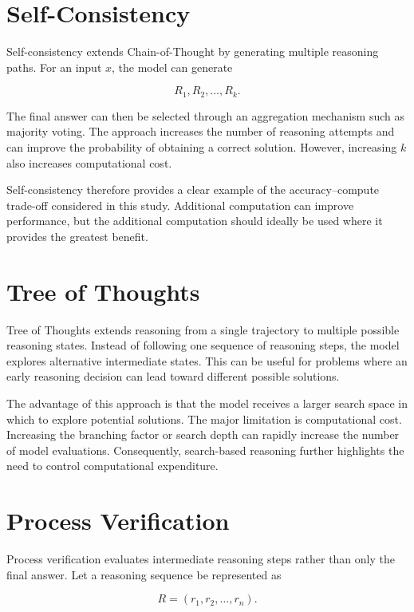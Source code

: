\documentclass[12pt,a4paper,titlepage]{report}
\begin{document}
\section{Self-Consistency}

Self-consistency extends Chain-of-Thought by generating multiple reasoning paths. For an input $x$, the model can generate

\begin{equation}
R_1,R_2,\ldots,R_k.
\end{equation}

The final answer can then be selected through an aggregation mechanism such as majority voting. The approach increases the number of reasoning attempts and can improve the probability of obtaining a correct solution. However, increasing $k$ also increases computational cost.

Self-consistency therefore provides a clear example of the accuracy--compute trade-off considered in this study. Additional computation can improve performance, but the additional computation should ideally be used where it provides the greatest benefit.

\section{Tree of Thoughts}

Tree of Thoughts extends reasoning from a single trajectory to multiple possible reasoning states. Instead of following one sequence of reasoning steps, the model explores alternative intermediate states. This can be useful for problems where an early reasoning decision can lead toward different possible solutions.

The advantage of this approach is that the model receives a larger search space in which to explore potential solutions. The major limitation is computational cost. Increasing the branching factor or search depth can rapidly increase the number of model evaluations. Consequently, search-based reasoning further highlights the need to control computational expenditure.

\section{Process Verification}

Process verification evaluates intermediate reasoning steps rather than only the final answer. Let a reasoning sequence be represented as

\begin{equation}
R=(r_1,r_2,\ldots,r_n).
\end{equation}
\end{document}
